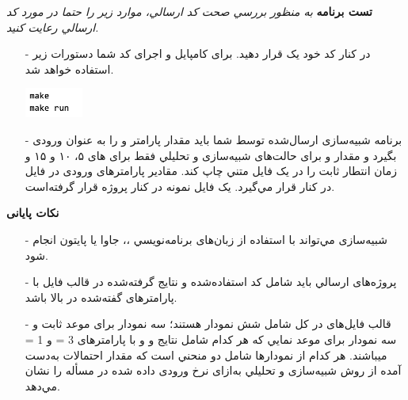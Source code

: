 \documentclass[12pt]{article}
\begin{document}
	\textbf{تست برنامه}
	\newline
    \textit{به منظور بررسي صحت کد ارسالي، موارد زیر را حتما در مورد کد ارسالي رعایت کنید.}
	\begin{itemize}
	\item[-]
در کنار کد خود یک  قرار دهید. برای کامپایل و اجرای کد شما دستورات زیر استفاده خواهد شد.
	\begin{center}
	        \raggedright
            \includegraphics[width=0.15\textwidth]{Content/2.8.png}
    \end{center}
    \item[-]
    برنامه شبیه‌سازی ارسال‌شده توسط شما باید مقدار پارامتر \lr{$\theta$} و \lr{$\mu$} را به عنوان ورودی بگیرد و مقدار  و  برای حالت‌های
شبیه‌سازی و تحلیلي فقط برای \lr{$\lambda$} های ۵، ۱۰ و ۱۵ و زمان انتطار ثابت را در یک فایل متني چاپ کند. مقادیر پارامترهای ورودی در فایل  در کنار  قرار مي‌گیرد. یک فایل نمونه در کنار پروژه قرار گرفته‌است.
    \end{itemize}
    
    \newpage
    \textbf{نکات پایانی}
    \begin{itemize}
	\item[-]
	شبیه‌سازی مي‌تواند با استفاده از زبان‌های برنامه‌نویسي  ،، جاوا یا پایتون انجام شود.
	\item[-]
	پروژه‌های ارسالي باید شامل کد استفاده‌شده و نتایج گرفته‌شده در قالب فایل  با پارامترهای گفته‌شده در بالا
باشد.
    \item[-]
    قالب فایل‌های  در کل شامل شش نمودار هستند؛ سه نمودار برای موعد ثابت و سه نمودار برای موعد نمایي که هر
کدام شامل نتایج  و  و  با پارامترهای 3 = \lr{$\theta$} و 1 = \lr{$\mu$} ميباشند. هر کدام از نمودارها شامل دو منحني است که
مقدار احتمالات به‌دست آمده از روش شبیه‌سازی و تحلیلي به‌ازای نرخ ورودی داده شده در مسأله را نشان مي‌دهد.
	\end{itemize}
	
\end{document}
